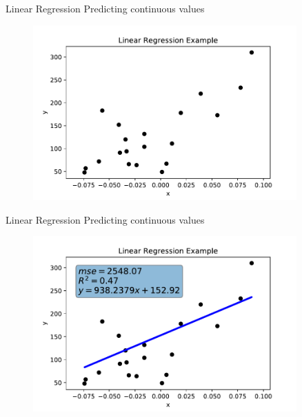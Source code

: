 \documentclass[10pt]{beamer}
\begin{document}
\begin{frame}{Linear Regression}
Predicting continuous values
	\begin{figure}	
		\includegraphics[width=0.9\textwidth, center, trim=0cm 0cm 0 0cm]{images/Linear_scatter.pdf}
	\end{figure}
\end{frame}

\begin{frame}{Linear Regression}
Predicting continuous values
	\begin{figure}	
		\includegraphics[width=0.9\textwidth, center, trim=0cm 0cm 0 0cm]{images/Linear_Reg_scatter.pdf}
	\end{figure}
\end{frame}
\end{document}
